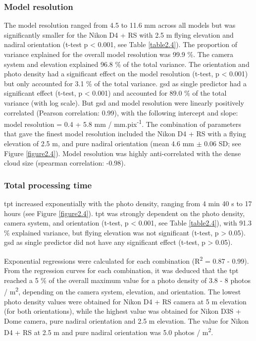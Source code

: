 \subsubsection{Model resolution}\label{chapitre2_3.1.3}
The model resolution ranged from 4.5 to 11.6 mm across all models but was significantly smaller for the Nikon D4 + RS with 2.5 m flying elevation and nadiral orientation (t-test p < 0.001, see Table \ref{table2.4}). The proportion of variance explained for the overall model resolution was 99.9 \%. The camera system and elevation explained 96.8 \% of the total variance. The orientation and photo density had a significant effect on the model resolution (t-test, p < 0.001) but only accounted for 3.1 \% of the total variance. \acrshort{gsd} as single predictor had a significant effect (t-test, p < 0.001) and accounted for 89.0 \% of the total variance (with log scale). But \acrshort{gsd} and model resolution were linearly positively correlated (Pearson correlation: 0.99), with the following intercept and slope: model resolution = 0.4 + 5.8 mm / mm.pix\textsuperscript{-1}. The combination of parameters that gave the finest model resolution included the Nikon D4 + RS with a flying elevation of 2.5 m, and pure nadiral orientation (mean 4.6 mm $\pm$ 0.06 SD; see Figure \ref{figure2.4}). Model resolution was highly anti-correlated with the dense cloud size (spearman correlation: -0.98).

\subsubsection{Total processing time}\label{chapitre2_3.1.4}
\acrshort{tpt} increased exponentially with the photo density, ranging from 4 min 40 s to 17 hours (see Figure \ref{figure2.4}). \acrshort{tpt} was strongly dependent on the photo density, camera system, and orientation (t-test, p < 0.001, see Table \ref{table2.4}), with 91.3 \% explained variance, but flying elevation was not significant (t-test, p > 0.05). \acrshort{gsd} as single predictor did not have any significant effect (t-test, p > 0.05).

Exponential regressions were calculated for each combination (R\textsuperscript{2} = 0.87 - 0.99). From the regression curves for each combination, it was deduced that the \acrshort{tpt} reached a 5 \% of the overall maximum value for a photo density of 3.8 - 8 photos / m\textsuperscript{2}, depending on the camera system, elevation, and orientation. The lowest photo density values were obtained for Nikon D4 + RS camera at 5 m elevation (for both orientations), while the highest value was obtained for Nikon D3S + Dome camera, pure nadiral orientation and 2.5 m elevation. The value for Nikon D4 + RS at 2.5 m and pure nadiral orientation was 5.0 photos / m\textsuperscript{2}.

